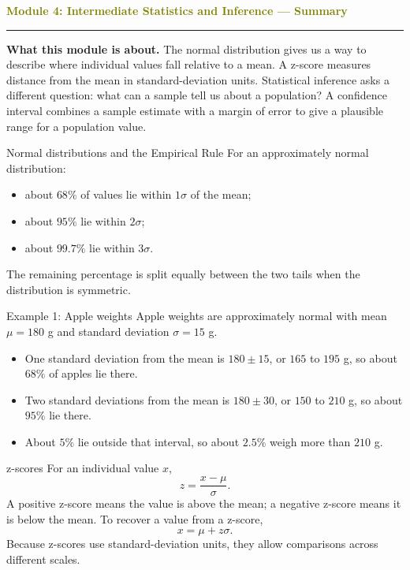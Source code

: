 \documentclass[11pt]{article}
\newcommand{\summaryhead}[2]{%
  \clearpage
  {\Large\bfseries\textcolor{olive}{Module #1: #2 — Summary}}\par
  \vspace{2pt}\textcolor{gold}{\rule{\linewidth}{1.2pt}}\par\smallskip
}
\begin{document}
\summaryhead{4}{Intermediate Statistics and Inference}

\textbf{What this module is about.} The normal distribution gives us a way to describe where individual values fall relative to a mean. A z-score measures distance from the mean in standard-deviation units. Statistical inference asks a different question: what can a sample tell us about a population? A confidence interval combines a sample estimate with a margin of error to give a plausible range for a population value.

\begin{keybox}{Normal distributions and the Empirical Rule}
For an approximately normal distribution:
\begin{itemize}
\item about \(68\%\) of values lie within \(1\sigma\) of the mean;
\item about \(95\%\) lie within \(2\sigma\);
\item about \(99.7\%\) lie within \(3\sigma\).
\end{itemize}
The remaining percentage is split equally between the two tails when the distribution is symmetric.
\end{keybox}

\begin{examplebox}{Example 1: Apple weights}
Apple weights are approximately normal with mean \(\mu=180\) g and standard deviation \(\sigma=15\) g.
\begin{itemize}
\item One standard deviation from the mean is \(180\pm15\), or \(165\) to \(195\) g, so about \(68\%\) of apples lie there.
\item Two standard deviations from the mean is \(180\pm30\), or \(150\) to \(210\) g, so about \(95\%\) lie there.
\item About \(5\%\) lie outside that interval, so about \(2.5\%\) weigh more than \(210\) g.
\end{itemize}
\end{examplebox}

\begin{keybox}{z-scores}
For an individual value \(x\),
\[
z=\frac{x-\mu}{\sigma}.
\]
A positive z-score means the value is above the mean; a negative z-score means it is below the mean. To recover a value from a z-score,
\[
x=\mu+z\sigma.
\]
Because z-scores use standard-deviation units, they allow comparisons across different scales.
\end{keybox}
\end{document}
